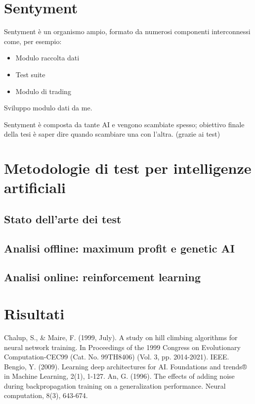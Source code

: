 \documentclass{article}
\numberwithin{equation}{section}
\begin{document}
	
	\newpage
	\section{Sentyment}
		Sentyment è un organismo ampio, formato da numerosi componenti interconnessi come, per esempio:
		\begin{itemize}
			\item Modulo raccolta dati
			\item Test suite
			\item Modulo di trading
		\end{itemize}
	
	
		Sviluppo modulo dati da me.
		
		Sentyment è composta da tante AI e vengono scambiate spesso; obiettivo finale della tesi è saper dire quando scambiare una con l'altra. (grazie ai test)
	    
	\newpage
	\section{Metodologie di test per intelligenze artificiali}	
	\subsection{Stato dell'arte dei test}
	\subsection{Analisi offline: maximum profit e genetic AI}
	\subsection{Analisi online: reinforcement learning}
	
	\newpage
	\section{Risultati}
		
	\newpage
	\cite{es}

	\begin{thebibliography}{9}
		Chalup, S., \& Maire, F. (1999, July). A study on hill climbing algorithms for neural network training. In Proceedings of the 1999 Congress on Evolutionary Computation-CEC99 (Cat. No. 99TH8406) (Vol. 3, pp. 2014-2021). IEEE.
		\bibitem{}
		Bengio, Y. (2009). Learning deep architectures for AI. Foundations and trends® in Machine Learning, 2(1), 1-127.
		\bibitem{}
		An, G. (1996). The effects of adding noise during backpropagation training on a generalization performance. Neural computation, 8(3), 643-674.
	\end{thebibliography}

	\printindex
\end{document}
